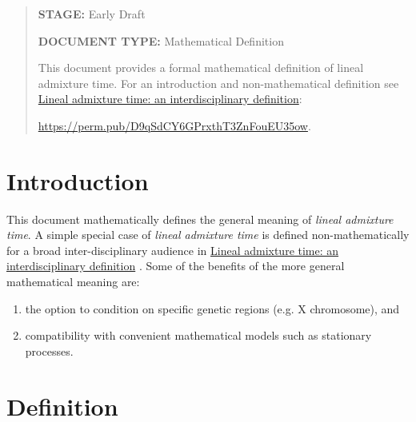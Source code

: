 





\newcommand{\dom}{\operatorname{dom}}
\newcommand{\mathstop}{\text{ .}}

\newcommand{\Tim}{\mathrm{Tim}}
\newcommand{\Hap}{\mathrm{Hap}}
\newcommand{\Dip}{\mathrm{Dip}}
\newcommand{\Par}{\mathrm{Par}}
\newcommand{\Pat}{\mathrm{Pat}}
\newcommand{\Loc}{\mathrm{Loc}}
\newcommand{\Lin}{\mathrm{Lin}}
\newcommand{\Fert}{\mathrm{Fert}}
\newcommand{\Mrlt}{\mathrm{Mrlt}}
\newcommand{\Lat}{\mathrm{Lat}}
\newcommand{\Cat}{\mathrm{Cat}}


\begin{abstract}
\textbf{STAGE:} Early Draft

\textbf{DOCUMENT TYPE:} Mathematical Definition

This document provides a formal mathematical definition of lineal
admixture time. For an introduction and non-mathematical definition see
\href{https://perm.pub/D9qSdCY6GPrxthT3ZnFouEU35ow}{Lineal admixture time: an interdisciplinary definition}:

\href{https://perm.pub/D9qSdCY6GPrxthT3ZnFouEU35ow}{https://perm.pub/D9qSdCY6GPrxthT3ZnFouEU35ow}.
\end{abstract}

\section{Introduction}

This document mathematically defines the general meaning of \emph{lineal admixture time}.
A simple special case of \emph{lineal admixture time} is defined non-mathematically
for a broad inter-disciplinary audience in
\href{https://perm.pub/D9qSdCY6GPrxthT3ZnFouEU35ow}{Lineal admixture time: an interdisciplinary definition}
\cite{dsi:D9/1}.
Some of the benefits of the more general mathematical meaning are:
\begin{enumerate}
\item the option to condition on specific genetic regions (e.g. X chromosome), and
\item compatibility with convenient mathematical models such as stationary processes.
\end{enumerate}


\section{Definition}

